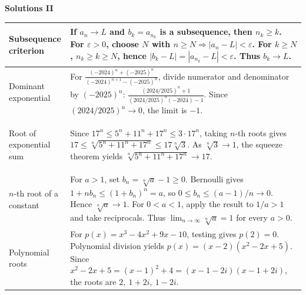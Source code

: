 {\begin{minipage}[t]{0.495\textwidth}
\begin{tabular}{
    @{}
    >{\bfseries\raggedright\arraybackslash}p{2.9cm}
    >{\raggedright\arraybackslash}p{10.5cm}
    @{}
}
\bottomrule
\end{tabular}

\end{minipage}
\hfill
\begin{minipage}[t]{0.495\textwidth}
\vspace{0pt}

\textbf{\large Solutions II}\par
\vspace{2pt}

\begin{tabular}{
    @{}
    >{\bfseries\raggedright\arraybackslash}p{3.0cm}
    >{\raggedright\arraybackslash}p{10.4cm}
    @{}
}
\toprule

Subsequence criterion &
If $a_n\to L$ and $b_k=a_{n_k}$ is a subsequence, then
$n_k\ge k$.
For $\varepsilon>0$, choose $N$ with
$n\ge N\Rightarrow|a_n-L|<\varepsilon$.
For $k\ge N$,
$n_k\ge k\ge N$, hence
$|b_k-L|=|a_{n_k}-L|<\varepsilon$.
Thus $\boxed{b_k\to L}$.
\\

\midrule

Dominant exponential &
For
$\frac{(-2024)^n+(-2025)^n}
{(-2024)^{n+1}-(-2025)^n}$,
divide numerator and denominator by $(-2025)^n$:
$\frac{(2024/2025)^n+1}
{(2024/2025)^n(-2024)-1}$.
Since $(2024/2025)^n\to0$, the limit is
$\boxed{-1}$.
\\

\midrule

Root of exponential sum &
Since
$17^n\le5^n+11^n+17^n\le3\cdot17^n$,
taking $n$-th roots gives
$17\le\sqrt[n]{5^n+11^n+17^n}
\le17\sqrt[n]{3}$.
As $\sqrt[n]{3}\to1$, the squeeze theorem yields
$\boxed{\sqrt[n]{5^n+11^n+17^n}\to17}$.
\\

\midrule

$n$-th root of a constant &
For $a>1$, set $b_n=\sqrt[n]{a}-1\ge0$.
Bernoulli gives
$1+nb_n\le(1+b_n)^n=a$,
so $0\le b_n\le(a-1)/n\to0$.
Hence $\sqrt[n]{a}\to1$.
For $0<a<1$, apply the result to $1/a>1$ and take reciprocals.
Thus $\boxed{\lim_{n\to\infty}\sqrt[n]{a}=1}$ for every $a>0$.
\\

\midrule

Polynomial roots &
For
$p(x)=x^3-4x^2+9x-10$, testing gives $p(2)=0$.
Polynomial division yields
$p(x)=(x-2)(x^2-2x+5)$.
Since
$x^2-2x+5=(x-1)^2+4
=(x-1-2i)(x-1+2i)$,
the roots are
$\boxed{2,\ 1+2i,\ 1-2i}$.
\\


\end{tabular}
\end{minipage}}
